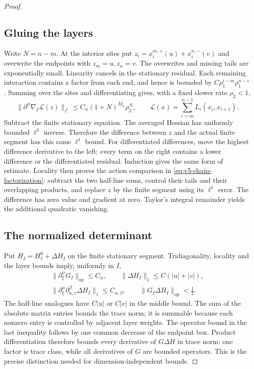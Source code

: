 \begin{proof}
\subsection*{Gluing the layers}
Write $N=n-m$. At the interior sites put
$z_i=x_i^{m,+}(u)+x_i^{n,-}(v)$ and overwrite the endpoints with
$z_m=u,z_n=v$. The overwrites and missing tails are exponentially
small. Linearity cancels in the stationary residual. Each remaining
interaction contains a factor from each end, and hence is bounded by
$C\rho_1^{i-m}\rho_1^{n-i}$. Summing over the sites and differentiating
gives, with a fixed slower rate $\rho_2<1$,
\[
 \|\partial^\alpha \nabla_I\mathcal L(z)\|_{\ell^1}
 \le C_\alpha(1+N)^{M_\alpha}\rho_2^N,
 \qquad \mathcal L(x)=\sum_{i=m}^{n-1}L_i(x_i,x_{i+1}).
\]
Subtract the finite stationary equation. The averaged Hessian has
uniformly bounded $\ell^1$ inverse. Therefore the difference between
$z$ and the actual finite segment has this same $\ell^1$ bound.
For differentiated differences, move the highest difference derivative
to the left; every term on the right contains a lower difference
or the differentiated residual. Induction gives the same form of
estimate. Locality then proves the action comparison in
\eqref{eq:v5-chain-factorization}: subtract the two half-line sums,
control their tails and their overlapping products, and replace $z$
by the finite segment using its $\ell^1$ error. The difference has zero
value and gradient at zero. Taylor's integral remainder yields the
additional quadratic vanishing.

\subsection*{The normalized determinant}
Put $H_I=H_I^0+\Delta H_I$ on the finite stationary segment.
Tridiagonality, locality and the layer bounds imply, uniformly in $I$,
\begin{equation}\label{eq:v5-operator-trace-bounds}
 \begin{gathered}
 \|\partial_\xi^\alpha G_I\|_{\mathrm{op}}\le C_\alpha,
 \qquad \|\Delta H_I\|_1\le C(|u|+|v|),\\
 \|\partial_\xi^\alpha\partial_{u,v}^\beta\Delta H_I\|_1
       \le C_{\alpha,\beta},\qquad
 \|G_I\Delta H_I\|_{\mathrm{op}}<\tfrac12.
 \end{gathered}
\end{equation}
The half-line analogues have $C|u|$ or $C|v|$ in the middle bound.
The sum of the absolute matrix entries bounds the trace norm; it is
summable because each nonzero entry is controlled by adjacent layer
weights. The operator bound in the last inequality follows by one
common decrease of the endpoint box. Product differentiation therefore
bounds every derivative of $G\Delta H$ in trace norm: one factor is
trace class, while all derivatives of $G$ are bounded operators.
This is the precise distinction needed for dimension-independent
bounds.


\end{proof}
